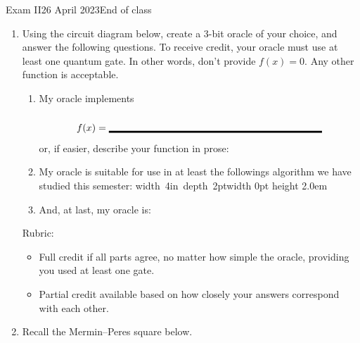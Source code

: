\documentclass[12pt]{article}
\newcommand{\Blank}[1][1in]{\mbox{\vrule width #1 depth 2pt}\vrule width 0pt height 2.0em}
\begin{document}
\begin{assignment}{Exam II}{26 April 2023}{End of class}
\begin{enumerate}
\clearpage\item{}
Using the circuit diagram below, create a 3-bit oracle of your choice, and answer the following questions.  To receive credit, your oracle must use at least one quantum gate.  In other words, don't provide $f(x)=0$. Any other function is acceptable.

\begin{enumerate}
    \item My oracle implements \[f(x)=\Blank[3in]{}\]
    or, if easier, describe your function in prose:
    \LeaveSpace{1.5in}
    \item My oracle is suitable for use in at least the followings algorithm we have studied this semester: \Blank[4in]{}
    \item And, at last, my oracle is:
    
    \bigskip
    \begin{center}
\end{center}
\end{enumerate}
Rubric:
\begin{itemize}
    \item Full credit if all parts agree, no matter how simple the oracle, providing you used at least one gate.
    \item Partial credit available based on how closely your answers correspond with each other.
\end{itemize}

\clearpage\item{} Recall the Mermin--Peres square below.


\end{enumerate}
\end{assignment}
\end{document}
